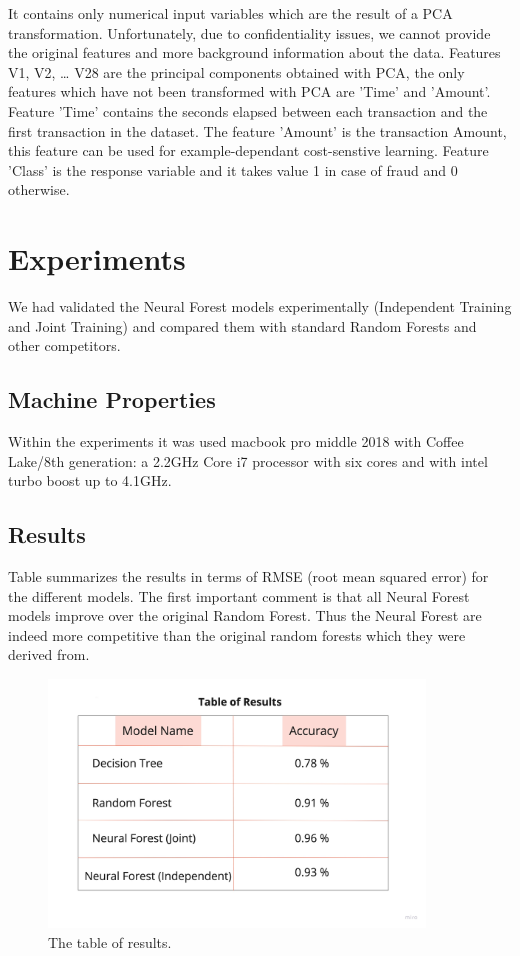 \documentclass{article}
\begin{document}
It contains only numerical input variables which are the result of a PCA transformation. Unfortunately, due to confidentiality issues, we cannot provide the original features and more background information about the data. Features V1, V2, … V28 are the principal components obtained with PCA, the only features which have not been transformed with PCA are 'Time' and 'Amount'. Feature 'Time' contains the seconds elapsed between each transaction and the first transaction in the dataset. The feature 'Amount' is the transaction Amount, this feature can be used for example-dependant cost-senstive learning. Feature 'Class' is the response variable and it takes value 1 in case of fraud and 0 otherwise.

\section{Experiments}
We had validated the Neural Forest models experimentally (Independent Training  and Joint Training) and compared them with standard Random Forests and other competitors. 

\subsection{Machine Properties}
Within the experiments it was used macbook pro middle 2018 with Coffee Lake/8th generation: a 2.2GHz Core i7 processor with six cores and with intel turbo boost up to 4.1GHz.

\subsection{Results}
Table summarizes the results in terms of RMSE (root mean squared error) for the different models. The first important comment is that all Neural Forest models improve over the original Random Forest. Thus the Neural Forest are indeed more competitive than the original random forests which they were derived from. 
\begin{figure}[h]
    \centering \includegraphics[width=10cm]{images/TableofResults.jpg}
    \caption {The table of results.}
    \label{fig:ct_spine}
\end{figure}
\end{document}
